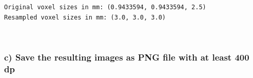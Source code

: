 \documentclass[11pt]{article}
\begin{document}
    \begin{Verbatim}[commandchars=\\\{\}]
Original voxel sizes in mm: (0.9433594, 0.9433594, 2.5)
Resampled voxel sizes in mm: (3.0, 3.0, 3.0)
    \end{Verbatim}

    \begin{center}
    \end{center}
    { \hspace*{\fill} \\}
    
    \hypertarget{c-save-the-resulting-images-as-png-file-with-at-least-400-dp}{%
\subsubsection{c) Save the resulting images as PNG file with at least
400
dp}\label{c-save-the-resulting-images-as-png-file-with-at-least-400-dp}}
\end{document}

